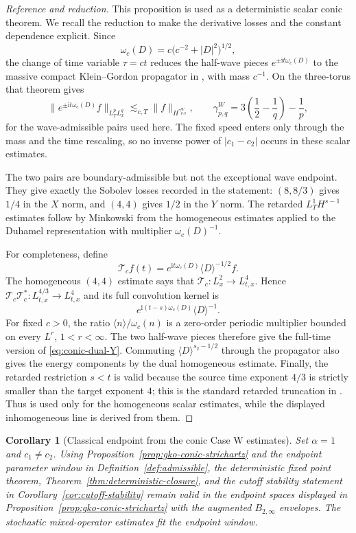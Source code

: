 \documentclass[10pt]{amsart}
\numberwithin{equation}{section}
\theoremstyle{plain}
\newtheorem{corollary}[theorem]{Corollary}
\theoremstyle{definition}
\theoremstyle{remark}
\newcommand{\ii}{\mathrm{i}}
\begin{document}
\begin{proof}[Reference and reduction]
This proposition is used as a deterministic scalar conic theorem.  We recall the reduction to make the derivative losses and the constant dependence explicit.  Since
\[
        \omega_c(D)=c\bigl(c^{-2}+|D|^2\bigr)^{1/2},
\]
the change of time variable $\tau=ct$ reduces the half-wave pieces $e^{\pm\ii t\omega_c(D)}$ to the massive compact Klein--Gordon propagator in \cite[Theorem~1(1)]{CacciafestaDanesiMeng}, with mass $c^{-1}$.  On the three-torus that theorem gives
\[
 \|e^{\pm\ii t\omega_c(D)}f\|_{L_T^pL_x^q}
 \lesssim_{c,T}\|f\|_{H^{\gamma^W_{p,q}}},
 \qquad
 \gamma^W_{p,q}=3\left(\frac12-\frac1q\right)-\frac1p,
\]
for the wave-admissible pairs used here.  The fixed speed enters only through the mass and the time rescaling, so no inverse power of $|c_1-c_2|$ occurs in these scalar estimates.

The two pairs are boundary-admissible but not the exceptional wave endpoint.
They give exactly the Sobolev losses recorded in the statement: $(8,8/3)$
gives $1/4$ in the $X$ norm, and $(4,4)$ gives $1/2$ in the $Y$ norm.  The
retarded $L_T^1H^{s-1}$ estimates follow by Minkowski from the homogeneous
estimates applied to the Duhamel representation with multiplier
$\omega_c(D)^{-1}$.

For completeness, define
\[
        \mathcal T_cf(t)=
        e^{\ii t\omega_c(D)}\langle D\rangle^{-1/2}f.
\]
The homogeneous $(4,4)$ estimate says that
$\mathcal T_c:L_x^2\to L_{t,x}^4$.  Hence
$\mathcal T_c\mathcal T_c^*:L_{t,x}^{4/3}\to L_{t,x}^4$ and its full
convolution kernel is
\[
        e^{\ii(t-s)\omega_c(D)}\langle D\rangle^{-1}.
\]
For fixed $c>0$, the ratio
$\langle n\rangle/\omega_c(n)$ is a zero-order periodic multiplier bounded on
every $L^r$, $1<r<\infty$.  The two half-wave pieces therefore give the full-time
version of \eqref{eq:conic-dual-Y}.  Commuting
$\langle D\rangle^{s_2-1/2}$ through the propagator also gives the energy
components by the dual homogeneous estimate.  Finally, the retarded
restriction $s<t$ is valid because the source time exponent $4/3$ is strictly
smaller than the target exponent $4$; this is the standard retarded
truncation in \cite{KeelTao}.  Thus \cite[Theorem~1(1)]{CacciafestaDanesiMeng}
is used only for the homogeneous scalar estimates, while the displayed
inhomogeneous line is derived from them.
\end{proof}

\begin{corollary}[Classical endpoint from the conic Case W estimates]\label{cor:alpha-one-extension}
Set $\alpha=1$ and $c_1\ne c_2$.  Using Proposition~\ref{prop:gko-conic-strichartz} and the endpoint parameter window in Definition~\ref{def:admissible}, the deterministic fixed point theorem, Theorem~\ref{thm:deterministic-closure}, and the cutoff stability statement in Corollary~\ref{cor:cutoff-stability} remain valid in the endpoint spaces displayed in Proposition~\ref{prop:gko-conic-strichartz} with the augmented $B_{2,\infty}$ envelopes.  The stochastic mixed-operator estimates fit the endpoint window.
\end{corollary}
\end{document}
